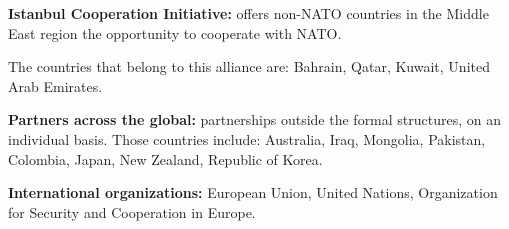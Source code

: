 \textbf{Istanbul Cooperation Initiative:} offers non-NATO countries in the Middle East region the opportunity to cooperate with NATO.

The countries that belong to this alliance are: Bahrain, Qatar, Kuwait, United Arab Emirates.

\textbf{Partners across the global:} partnerships outside the formal structures, on an individual basis. Those countries include: Australia, Iraq, Mongolia, Pakistan, Colombia, Japan, New Zealand, Republic of Korea.

\textbf{International organizations:} European Union, United Nations, Organization for Security and Cooperation in Europe.
